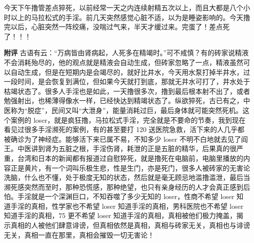 \begin{case}
    今天下午撸管差点猝死，以前经常一天之内连续射精五次以上，而且大都是八个小时以上的马拉松式的手淫。前几天突然感觉心脏不适，以为是睡姿影响的。今天撸完以后，心脏突然一阵绞痛，没喘过气来，半天才缓过来。完蛋了！差点死了！！！

    \textbf{附评} 古语有云：“万病皆由肾病起，人死多在精竭时。”可不戒慎？有的砖家说精液不会消耗殆尽的，他的观点就是精液会自动生成，但砖家忽略了一点，精液虽然可以自动生成，但是在短期内是会竭尽的，就好比井水，今天用水泵打掉半井水，过一段时间，是会恢复到满位，但如果今天就打到底，那就无井水可打了，井水处于枯竭状态了。很多人手淫也是如此，一天撸很多次，撸到最后根本射不出了，或者勉强射出，也稀薄得像水一样，已经快达到精竭状态了。纵欲猝死，古已有之，中医称为“脱症”，民间又叫“大泄身”，能量消耗过巨，最后身体就可能突然死机。这个案例的 loser，就是疯狂撸，马拉松式手淫，完全就是不要命的节奏，我到现在看见过很多手淫濒死的案例，有的甚至要打 120 送医院急救，活下来的人几乎都被确诊为了神经症。能够活下来已属不易，不知多少 loser 不明不白地就去见了阎王。中医讲到肾为五脏之根，手淫伤肾，耗泄的正是五脏的精华，后果真的很严重，台湾和日本的新闻都有报道过自慰猝死，就是撸死在电脑前，电脑里播放的内容正是黄片，有一个词叫乐极生悲，性是生门，亦是死门，很多人被砖家的无害论洗脑，什么也不懂，处于极度无知的状态，然后就是毫无顾忌地滥撸滥泄，最后当濒死感突然而至时，那种恐慌感，那种绝望，也只有亲身经历的人才会真正感到后怕。手淫就是一个深渊巨口，不知吞噬了多少无知的 loser，性商不希望 loser 知道手淫的真相，性学家也不希望 loser 知道手淫的真相，男科医院也不希望 loser 知道手淫的真相，75 更不希望 loser 知道手淫的真相，真相被他们极力掩盖，揭示真相的人被他们肆意诽谤，但真相依然是真相，真相与砖家无关，真相也与诽谤无关，真相一直在那里，真相会摧毁一切无害论！
\end{case}

